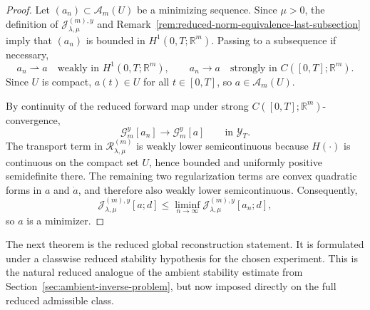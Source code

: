 \documentclass{article}
\theoremstyle{definition}
\begin{document}
\begin{proof}
    Let \((a_n)\subset \mathcal A_m(U)\) be a minimizing sequence. Since \(\mu>0\), the definition of
    \(\mathcal J_{\lambda,\mu}^{(m),y}\) and
    Remark~\ref{rem:reduced-norm-equivalence-last-subsection} imply that \((a_n)\) is bounded in
    \(H^1(0,T;\mathbb R^m)\). Passing to a subsequence if necessary,
    \[
        a_n \rightharpoonup a
        \quad\text{weakly in }H^1(0,T;\mathbb R^m),
        \qquad
        a_n\to a
        \quad\text{strongly in }C([0,T];\mathbb R^m).
    \]
    Since \(U\) is compact, \(a(t)\in U\) for all \(t\in[0,T]\), so \(a\in \mathcal A_m(U)\).

    By continuity of the reduced forward map under strong \(C([0,T];\mathbb R^m)\)-convergence,
    \[
        \mathcal G_m^y[a_n]\to \mathcal G_m^y[a]
        \qquad\text{in }\mathcal Y_T.
    \]
    The transport term in \(\mathcal R_{\lambda,\mu}^{(m)}\) is weakly lower semicontinuous because
    \(H(\cdot)\) is continuous on the compact set \(U\), hence bounded and uniformly positive
    semidefinite there. The remaining two regularization terms are convex quadratic forms in
    \(a\) and \(\dot a\), and therefore also weakly lower semicontinuous. Consequently,
    \[
        \mathcal J_{\lambda,\mu}^{(m),y}[a;d]
        \le
        \liminf_{n\to\infty}\mathcal J_{\lambda,\mu}^{(m),y}[a_n;d],
    \]
    so \(a\) is a minimizer.
\end{proof}

The next theorem is the reduced global reconstruction statement. It is formulated under a
classwise reduced stability hypothesis for the chosen experiment. This is the natural reduced
analogue of the ambient stability estimate from Section~\ref{sec:ambient-inverse-problem}, but
now imposed directly on the full reduced admissible class.
\end{document}
